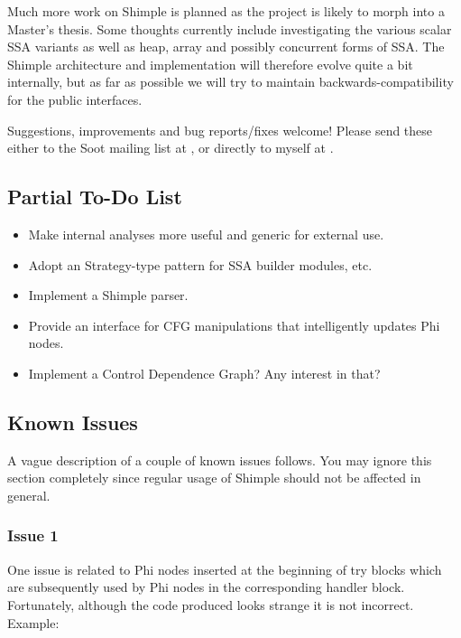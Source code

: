 \documentclass[10pt,letterpaper,oneside,onecolumn]{article}
\begin{document}
Much more work on Shimple is planned as the project is likely to morph
into a Master's thesis.  Some thoughts currently include investigating
the various scalar SSA variants as well as heap, array and possibly
concurrent forms of SSA.  The Shimple architecture and implementation
will therefore evolve quite a bit internally, but as far as possible
we will try to maintain backwards-compatibility for the public
interfaces.

Suggestions, improvements and bug reports/fixes welcome!  Please send
these either to the Soot mailing list at
, or directly to myself
at
.

\subsection{Partial To-Do List}

\begin{itemize}
\item Make internal analyses more useful and generic for external use.
\item Adopt an Strategy-type pattern for SSA builder modules, etc.
\item Implement a Shimple parser.
\item Provide an interface for CFG manipulations that intelligently 
updates Phi nodes.
\item Implement a Control Dependence Graph?  Any interest in that?
\end{itemize}

\subsection{Known Issues}

A vague description of a couple of known issues follows.  You may
ignore this section completely since regular usage of Shimple should
not be affected in general.

\subsubsection{Issue 1}

One issue is related to Phi nodes inserted at the beginning of try
blocks which are subsequently used by Phi nodes in the corresponding
handler block.  Fortunately, although the code produced looks strange
it is not incorrect.  Example:
\end{document}
